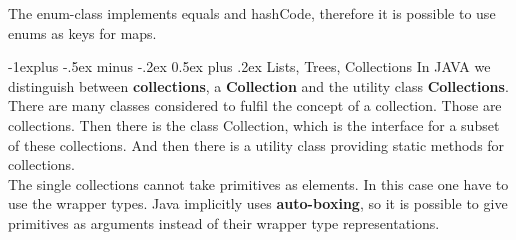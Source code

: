 \documentclass[10pt,landscape]{article}
\makeatletter
\renewcommand{\subsection}{\@startsection{subsection}{2}{0mm}%
                                {-1explus -.5ex minus -.2ex}%
                                {0.5ex plus .2ex}%
                                {\normalfont\normalsize\bfseries}}
\makeatother
\begin{document}
\begin{multicols}{3}
The enum-class implements equals and hashCode, therefore it is possible to use enums as keys for maps.

\subsection{Lists, Trees, Collections}
In JAVA we distinguish between \textbf{collections}, a \textbf{Collection} and the utility class \textbf{Collections}.\\
There are many classes considered to fulfil the concept of a collection. Those are collections. Then there is the class Collection, which is the interface for a subset of these collections. And then there is a utility class providing static methods for collections.\\
The single collections cannot take primitives as elements. In this case one have to use the wrapper types. Java implicitly uses \textbf{auto-boxing}, so it is possible to give primitives as arguments instead of their wrapper type representations.

\end{multicols}
\end{document}
